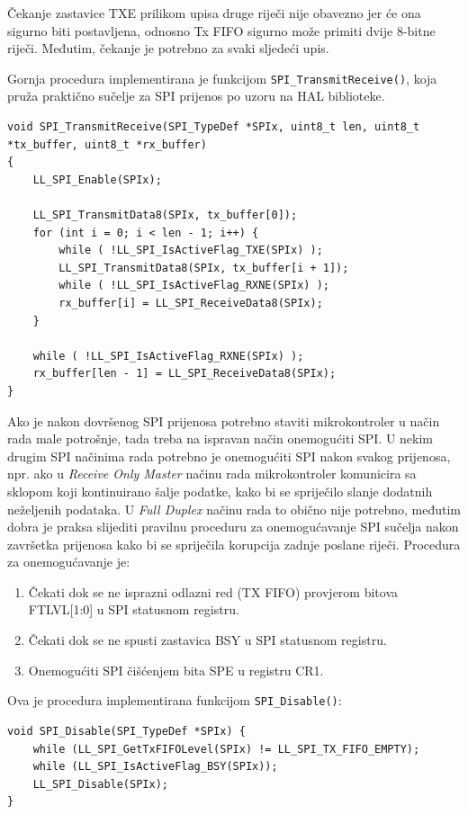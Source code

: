 Čekanje zastavice TXE prilikom upisa druge riječi nije obavezno jer će ona sigurno biti postavljena, odnosno Tx FIFO sigurno može primiti dvije 8-bitne riječi. Međutim, čekanje je potrebno za svaki sljedeći upis.

Gornja procedura implementirana je funkcijom \texttt{SPI\_TransmitReceive()}, koja pruža praktično sučelje za SPI prijenos po uzoru na HAL biblioteke.

\begin{lstlisting}
void SPI_TransmitReceive(SPI_TypeDef *SPIx, uint8_t len, uint8_t *tx_buffer, uint8_t *rx_buffer) 
{
	LL_SPI_Enable(SPIx);
	
	LL_SPI_TransmitData8(SPIx, tx_buffer[0]);
	for (int i = 0; i < len - 1; i++) {
		while ( !LL_SPI_IsActiveFlag_TXE(SPIx) );
		LL_SPI_TransmitData8(SPIx, tx_buffer[i + 1]);
		while ( !LL_SPI_IsActiveFlag_RXNE(SPIx) );
		rx_buffer[i] = LL_SPI_ReceiveData8(SPIx);
	}
	
	while ( !LL_SPI_IsActiveFlag_RXNE(SPIx) );
	rx_buffer[len - 1] = LL_SPI_ReceiveData8(SPIx);
}
\end{lstlisting}

Ako je nakon dovršenog SPI prijenosa potrebno staviti mikrokontroler u način rada male potrošnje, tada treba na ispravan način onemogućiti SPI. U nekim drugim SPI načinima rada potrebno je onemogućiti SPI nakon svakog prijenosa, npr. ako u \textit{Receive Only Master} načinu rada mikrokontroler komunicira sa sklopom koji kontinuirano šalje podatke, kako bi se spriječilo slanje dodatnih neželjenih podataka. U \textit{Full Duplex} načinu rada to obično nije potrebno, međutim dobra je praksa slijediti pravilnu proceduru za onemogućavanje SPI sučelja nakon završetka prijenosa kako bi se spriječila korupcija zadnje poslane riječi. Procedura za onemogućavanje je:

\begin{enumerate}
	\item Čekati dok se ne isprazni odlazni red (TX FIFO) provjerom bitova FTLVL[1:0] u SPI statusnom registru.
	\item Čekati dok se ne spusti zastavica BSY u SPI statusnom registru.
	\item Onemogućiti SPI čišćenjem bita SPE u registru CR1.
\end{enumerate}

Ova je procedura implementirana funkcijom \texttt{SPI\_Disable()}:

\begin{lstlisting}
void SPI_Disable(SPI_TypeDef *SPIx) {
	while (LL_SPI_GetTxFIFOLevel(SPIx) != LL_SPI_TX_FIFO_EMPTY);
	while (LL_SPI_IsActiveFlag_BSY(SPIx));
	LL_SPI_Disable(SPIx);
}
\end{lstlisting}

